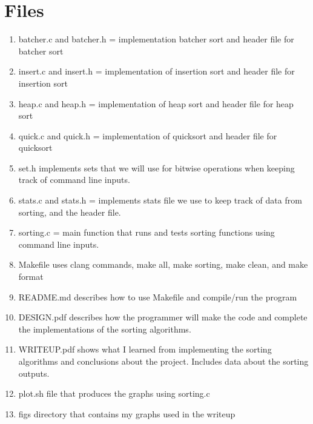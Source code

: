 \documentclass[11pt]{article}
\begin{document}
\section{Files}\label{ss:files}
\begin{enumerate}
\item batcher.c and batcher.h = implementation batcher sort and header file for batcher sort
\item insert.c and insert.h = implementation of insertion sort and header file for insertion sort
\item heap.c and heap.h = implementation of heap sort and header file for heap sort
\item quick.c and quick.h = implementation of quicksort and header file for quicksort
\item set.h implements sets that we will use for bitwise operations when keeping track of command line inputs.
\item stats.c and stats.h = implements stats file we use to keep track of data from sorting, and the header file.
\item sorting.c = main function that runs and tests sorting functions using command line inputs.
\item Makefile uses clang commands, make all, make sorting, make clean, and make format
\item README.md describes how to use Makefile and compile/run the program
\item DESIGN.pdf describes how the programmer will make the code and complete the implementations of the sorting algorithms.
\item WRITEUP.pdf shows what I learned from implementing the sorting algorithms and conclusions about the project. Includes data about the sorting outputs.
\item plot.sh file that produces the graphs using sorting.c
\item figs directory that contains my graphs used in the writeup
\end{enumerate}
\end{document}
